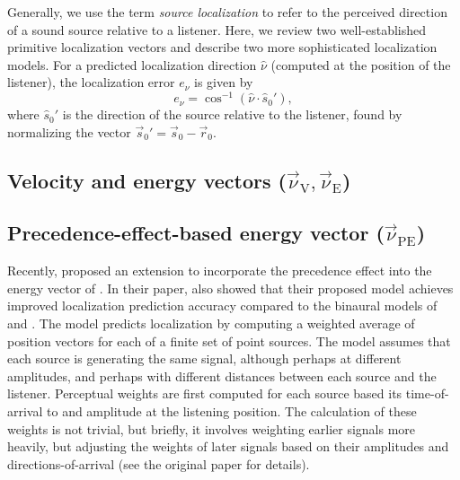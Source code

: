Generally, we use the term \textit{source localization} to refer to the perceived direction of a sound source relative to a listener.
Here, we review two well-established primitive localization vectors and describe two more sophisticated localization models.
For a predicted localization direction $\hat{\nu}$ (computed at the position of the listener), the localization error $e_\nu$ is given by
\begin{equation}\label{eq:04_Auditory_Models:Localization_Error}
e_\nu = \cos^{-1} \left( \hat{\nu} \cdot \hat{s}_0{}' \right),
\end{equation}
where $\hat{s}_0{}'$ is the direction of the source relative to the listener, found by normalizing the vector $\vec{s}_0{}' = \vec{s}_0 - \vec{r}_0$.

\subsection{Velocity and energy vectors (\texorpdfstring{$\vec{\nu}_{\text{V}}, \vec{\nu}_{\text{E}}$}{vV, vE})}\label{sec:04_Auditory_Models:Localization_Vectors}


\subsection{Precedence-effect-based energy vector (\texorpdfstring{$\vec{\nu}_{\text{PE}}$}{vPE})}\label{sec:04_Auditory_Models:PE_Energy_Vector}
Recently, \citet{Stitt2016} proposed an extension to incorporate the precedence effect into the energy vector of \citet{Gerzon1992}.
In their paper, \citeauthor{Stitt2016} also showed that their proposed model achieves improved localization prediction accuracy compared to the binaural models of \citet{Dietz2011} and \citet{Lindemann1986a}.
The model predicts localization by computing a weighted average of position vectors for each of a finite set of point sources.
The model assumes that each source is generating the same signal, although perhaps at different amplitudes, and perhaps with different distances between each source and the listener.
Perceptual weights are first computed for each source based its time-of-arrival to and amplitude at the listening position.
The calculation of these weights is not trivial, but briefly, it involves weighting earlier signals more heavily, but adjusting the weights of later signals based on their amplitudes and directions-of-arrival (see the original paper for details).

